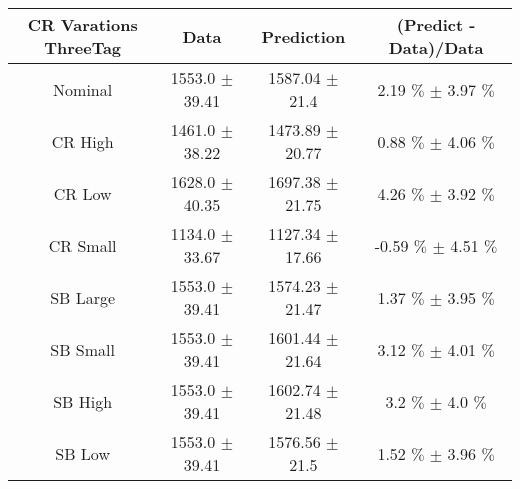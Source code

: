 \begin{footnotesize} 
\begin{tabular}{c|c|c|c} 
CR Varations ThreeTag & Data & Prediction & (Predict - Data)/Data \\ 
\hline\hline 
Nominal & 1553.0 $\pm$ 39.41 & 1587.04 $\pm$ 21.4 & 2.19 $\%$  $\pm$ 3.97 $\%$ \\ 
\hline 
CR High & 1461.0 $\pm$ 38.22 & 1473.89 $\pm$ 20.77 & 0.88 $\%$  $\pm$ 4.06 $\%$ \\ 
\hline 
CR Low & 1628.0 $\pm$ 40.35 & 1697.38 $\pm$ 21.75 & 4.26 $\%$  $\pm$ 3.92 $\%$ \\ 
\hline 
CR Small & 1134.0 $\pm$ 33.67 & 1127.34 $\pm$ 17.66 & -0.59 $\%$  $\pm$ 4.51 $\%$ \\ 
\hline 
SB Large & 1553.0 $\pm$ 39.41 & 1574.23 $\pm$ 21.47 & 1.37 $\%$  $\pm$ 3.95 $\%$ \\ 
\hline 
SB Small & 1553.0 $\pm$ 39.41 & 1601.44 $\pm$ 21.64 & 3.12 $\%$  $\pm$ 4.01 $\%$ \\ 
\hline 
SB High & 1553.0 $\pm$ 39.41 & 1602.74 $\pm$ 21.48 & 3.2 $\%$  $\pm$ 4.0 $\%$ \\ 
\hline 
SB Low & 1553.0 $\pm$ 39.41 & 1576.56 $\pm$ 21.5 & 1.52 $\%$  $\pm$ 3.96 $\%$ \\ 
\hline\hline 
\end{tabular} 
\end{footnotesize} 
\newline 
